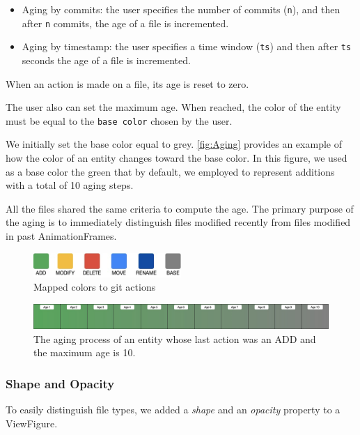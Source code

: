 \begin{itemize}
    \item{Aging by commits}: the user specifies the number of commits (\texttt{n}), and then after \texttt{n} commits, the age of a file is incremented. 
    \item{Aging by timestamp}:  the user specifies a time window (\texttt{ts}) and then after \texttt{ts} seconds the age of a file is incremented.
\end{itemize}

When an action is made on a file, its age is reset to zero. 

The user also can set the maximum age.
When reached, the color of the entity must be equal to the \texttt{base color} chosen by the user.
 
We initially set the base color equal to grey.
\autoref{fig:Aging} provides an example of how the color of an entity changes toward the base color. In this figure, we used as a base color the green that by default, we employed to represent additions with a total of 10 aging steps. 


All the files shared the same criteria to compute the age. The primary purpose of the aging is to immediately distinguish files modified recently from files modified in past AnimationFrames.

\begin{figure}
    \center
    \includegraphics[width=0.5\textwidth]{ColorMapping.jpg}
    \caption{Mapped colors to git actions}
    \label{fig:ColorAssociation}
\end{figure}


\begin{figure}
    \center
    \includegraphics[width=\textwidth]{Aging.jpg}
    \caption{The aging process of an entity whose last action was an ADD and the maximum age is 10. }
    \label{fig:Aging}
\end{figure}



\subsubsection*{Shape and Opacity}
To easily distinguish file types, we added a \textit{shape} and an \textit{opacity} property to a ViewFigure.

